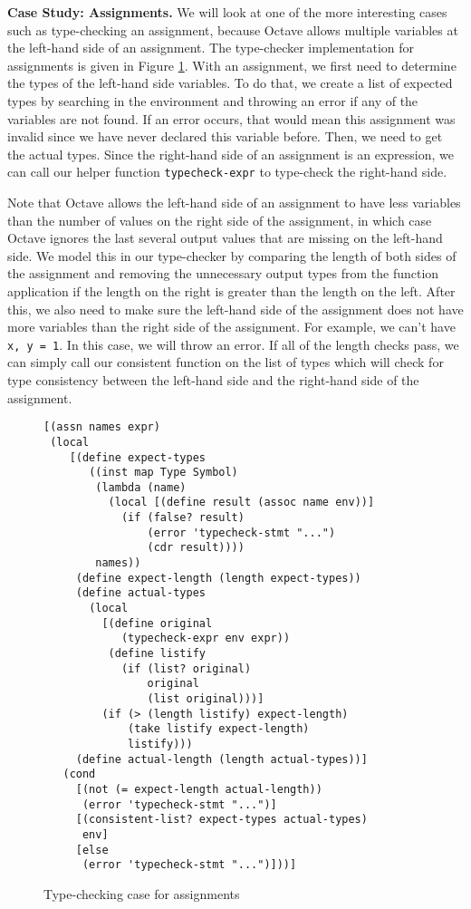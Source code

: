 {\bf Case Study: Assignments.} We will look at one of the more interesting cases such as type-checking an assignment, because Octave allows multiple variables at the left-hand side of an assignment. The type-checker implementation for assignments is given in Figure \ref{fig:assn}. With an assignment, we first need to determine the types of the left-hand side variables. To do that, we create a list of expected types by searching in the environment and throwing an error if any of the variables are not found. If an error occurs, that would mean this assignment was invalid since we have never declared this variable before. Then, we need to get the actual types. Since the right-hand side of an assignment is an expression, we can call our helper function {\tt typecheck-expr} to type-check the right-hand side.

Note that Octave allows the left-hand side of an assignment to have less variables than the number of values on the right side of the assignment, in which case Octave ignores the last several output values that are missing on the left-hand side. We model this in our type-checker by comparing the length of both sides of the assignment and removing the unnecessary output types from the function application if the length on the right is greater than the length on the left. After this, we also need to make sure the left-hand side of the assignment does not have more variables than the right side of the assignment. For example, we can't have {\tt x, y = 1}. In this case, we will throw an error. If all of the length checks pass, we can simply call our consistent function on the list of types which will check for type consistency between the left-hand side and the right-hand side of the assignment.  

\begin{figure}[h]
    \begin{lstlisting}[language=racket]
[(assn names expr)
 (local
    [(define expect-types
       ((inst map Type Symbol)
        (lambda (name)
          (local [(define result (assoc name env))]
            (if (false? result)
                (error 'typecheck-stmt "...")
                (cdr result))))
        names))
     (define expect-length (length expect-types))
     (define actual-types
       (local
         [(define original
            (typecheck-expr env expr))
          (define listify
            (if (list? original)
                original
                (list original)))]
         (if (> (length listify) expect-length)
             (take listify expect-length)
             listify)))
     (define actual-length (length actual-types))]
   (cond
     [(not (= expect-length actual-length))
      (error 'typecheck-stmt "...")]
     [(consistent-list? expect-types actual-types)
      env]
     [else
      (error 'typecheck-stmt "...")]))]
    \end{lstlisting}
    \caption[]{Type-checking case for assignments}
    \label{fig:assn}
\end{figure}


